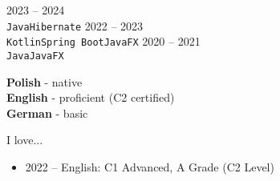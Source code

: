 \documentclass[9pt]{developercv} %
\begin{document}
\begin{entrylist}
    \entry
		{2023 -- 2024}
		{\lorem}
		{}
		{\lorem \lorem \lorem\\ \texttt{Java}\slashsep\texttt{Hibernate}}
	\entry
		{2022 -- 2023}
		{\lorem}
		{}
		{\lorem \lorem \lorem\\ \texttt{Kotlin}\slashsep\texttt{Spring Boot}\slashsep\texttt{JavaFX}}
	\entry
		{2020 -- 2021}
		{\lorem}
		{}
		{\lorem \lorem \lorem\\ \texttt{Java}\slashsep\texttt{JavaFX}}
\end{entrylist}



\begin{minipage}[t]{0.3\textwidth}
	\vspace{-\baselineskip} %

	
	\textbf{Polish} - native\\
	\textbf{English} - proficient (C2 certified)\\
	\textbf{German} - basic
\end{minipage}
\hfill
\begin{minipage}[t]{0.3\textwidth}
	\vspace{-\baselineskip} %
	
	
	I love... \lorem
\end{minipage}
\hfill
\begin{minipage}[t]{0.3\textwidth}
	\vspace{-\baselineskip} %
	
	\begin{itemize}
	    \item 2022 -- English: C1 Advanced, A Grade (C2 Level) 
	\end{itemize}
\end{minipage}

\end{document}

